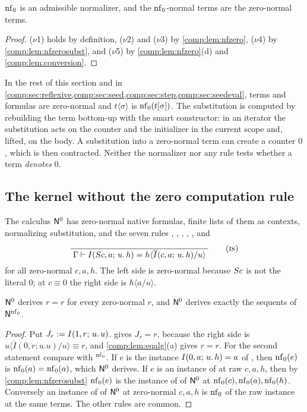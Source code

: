 \begin{proposition}
\label{comp:prop:nfzeroadm}
$\operatorname{nf}_0$ is an admissible normalizer, and the $\operatorname{nf}_0$-normal terms are the
zero-normal terms.
\end{proposition}

\begin{proof}
($\nu$1) holds by definition, ($\nu$2) and ($\nu$3) by
\cref{comp:lem:nfzero}, ($\nu$4) by \cref{comp:lem:nfzerosubst}, and
($\nu$5) by \cref{comp:lem:nfzero}(d) and \cref{comp:lem:conversion}.
\end{proof}

In the rest of this section and in
\cref{comp:sec:reflexive,comp:sec:seed,comp:sec:step,comp:sec:seedeval},
terms and formulas are zero-normal and $t\langle\sigma\rangle$ is
$\operatorname{nf}_0(t[\sigma])$. The substitution is computed by rebuilding the term
bottom-up with the smart constructor: in an iterator the substitution acts
on the counter and the initializer in the current scope and, lifted, on the
body. A substitution into a zero-normal term can create a counter $0$, which
is then contracted. Neither the normalizer nor any rule tests whether a term
\emph{denotes} $0$.

\subsection{The kernel without the zero computation rule}

\begin{definition}
\label{comp:def:nzero}
The calculus $\mathsf{N}^{0}$ has zero-normal native formulas, finite lists of
them as contexts, normalizing substitution, and the seven rules
, , , , ,
 and
\[
 \infrule{}{\Gamma\proves\It{\Suc c}{a}{u}{h}
            =h\langle\overline{I}(c,a;\,u.\,h)/u\rangle}
 \qquad\text{(\rulename{IS})}
\]
for all zero-normal $c,a,h$. The left side is zero-normal because $S c$
is not the literal $0$; at $c\equiv0$ the right side is
$h\langle a/u\rangle$.
\end{definition}

\begin{lemma}
\label{comp:lem:nzerorefl}
$\mathsf{N}^{0}$ derives $r=r$ for every zero-normal $r$, and $\mathsf{N}^{0}$ derives
exactly the sequents of $\mathsf{N}^{\operatorname{nf}_0}$.
\end{lemma}

\begin{proof}
Put $J_r\mathrel{:=}I(1,r;\,u.\,u)$.  gives $J_r=r$, because the
right side is $u\langle\overline{I}(0,r;u.u)/u\rangle\equiv r$, and
\cref{comp:lem:eqalg}(a) gives $r=r$. For the second statement compare
 with $^{\operatorname{nf}_0}$. If $e$ is the instance
$I(0,a;\,u.\,h)=a$ of , then $\operatorname{nf}_0(e)$ is
$\operatorname{nf}_0(a)=\operatorname{nf}_0(a)$, which $\mathsf{N}^{0}$ derives. If $e$ is an instance of
 at raw $c,a,h$, then by \cref{comp:lem:nfzerosubst}
$\operatorname{nf}_0(e)$ is the instance of  of $\mathsf{N}^{0}$ at
$\operatorname{nf}_0(c),\operatorname{nf}_0(a),\operatorname{nf}_0(h)$. Conversely an instance of  of
$\mathsf{N}^{0}$ at zero-normal $c,a,h$ is $\operatorname{nf}_0$ of the raw instance at the same
terms. The other rules are common.
\end{proof}

